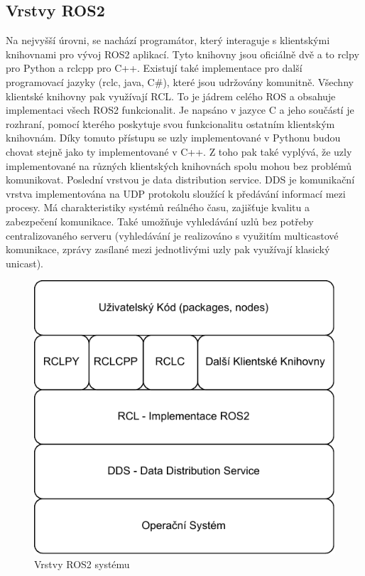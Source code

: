 \subsection*{Vrstvy ROS2}
Na nejvyšší úrovni, se nachází programátor, který interaguje s klientskými knihovnami pro vývoj ROS2 aplikací. Tyto knihovny jsou oficiálně dvě a to rclpy pro Python a rclcpp pro C++. Existují také implementace pro další programovací jazyky (rclc, java, C\#), které jsou udržovány komunitně. Všechny klientské knihovny pak využívají RCL. To je jádrem celého ROS a obsahuje implementaci všech ROS2 funkcionalit. Je napsáno v jazyce C a jeho součástí je rozhraní, pomocí kterého poskytuje svou funkcionalitu ostatním klientským knihovnám. Díky tomuto přístupu se uzly implementované v Pythonu budou chovat stejně jako ty implementované v C++. Z toho pak také vyplývá, že uzly implementované na různých klientských knihovnách spolu mohou bez problémů komunikovat.
Poslední vrstvou je data distribution service. DDS je komunikační vrstva implementována na UDP protokolu sloužící k předávání informací mezi procesy. Má charakteristiky systémů reálného času, zajišťuje kvalitu a zabezpečení komunikace. Také umožňuje vyhledávání uzlů bez potřeby centralizovaného serveru (vyhledávání je realizováno s využitím multicastové komunikace, zprávy zasílané mezi jednotlivými uzly pak využívají klasický unicast). \cite{ros2_introduction}

\begin{figure}[h!]
	\centering
	\includegraphics[scale=0.75]{obrazky-figures/ros_layers.pdf}
	\caption{Vrstvy ROS2 systému}
	\label{}
\end{figure}

